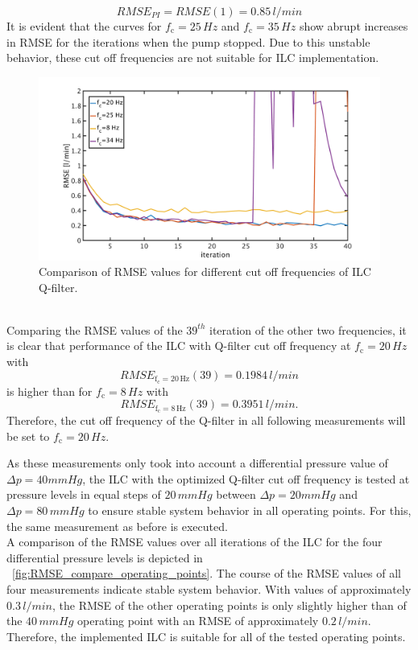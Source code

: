 \begin{equation}
  RMSE_{PI}=RMSE(1)= 0.85\,l/min
\end{equation}
It is evident that the curves for $f_{\mathrm{c}}=25\,Hz$ and $f_{\mathrm{c}}=35\,Hz$ show abrupt increases in RMSE for the iterations when the pump stopped. Due to this unstable behavior, these cut off frequencies are not suitable for ILC implementation.
\begin{figure}[ht]
  \centering
  \includegraphics[width=\textwidth]{images/chapt_5/ILC/RMSE_compare_ILC3_fc.pdf}
  \caption[Comparison of RMSE values for different cut off frequencies of ILC Q-filter]{Comparison of RMSE values for different cut off frequencies of ILC Q-filter.}
  \label{fig:RMSE_compare_ILC3_fc}
\end{figure}
\\Comparing the RMSE values of the $39^{th}$ iteration of the other two frequencies, it is clear that performance of the ILC with Q-filter cut off frequency at $f_{\mathrm{c}}=20\,Hz$ with
\begin{equation}
  RMSE_{\mathrm{f_{\mathrm{c}}=20\,Hz}}(39)=0.1984\,l/min
\end{equation}
is higher than for $f_{\mathrm{c}}=8\,Hz$ with
\begin{equation}
  RMSE_{\mathrm{f_{\mathrm{c}}=8\,Hz}}(39)=0.3951\,l/min.
\end{equation}
Therefore, the cut off frequency of the Q-filter in all following measurements will be set to $f_{\mathrm{c}}=20\,Hz$.

As these measurements only took into account a differential pressure value of $\Delta{p}=40mmHg$, the ILC with the optimized Q-filter cut off frequency is tested at pressure levels in equal steps of $20\,mmHg$ between $\Delta{p}=20mmHg$ and $\Delta{p}=80\,mmHg$ to ensure stable system behavior in all operating points. For this, the same measurement as before is executed.
\\A comparison of the RMSE values over all iterations of the ILC for the four differential pressure levels is depicted in \figurename~\ref{fig:RMSE_compare_operating_points}. The course of the RMSE values of all four measurements indicate stable system behavior. With values of approximately $0.3\, l/min$, the RMSE of the other operating points is only slightly higher than of the $40\,mmHg$ operating point with an RMSE of approximately $0.2\,l/min$. Therefore, the implemented ILC is suitable for all of the tested operating points.


